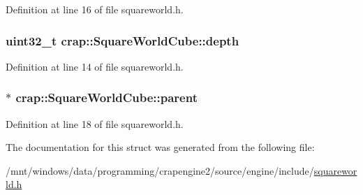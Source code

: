 Definition at line 16 of file squareworld.\+h.

\hypertarget{structcrap_1_1_square_world_cube_ace5f01b725ba2900714f1114e8d58ccf}{
\subsubsection[{depth}]{\setlength{\rightskip}{0pt plus 5cm}uint32\+\_\+t crap\+::\+Square\+World\+Cube\+::depth}}\label{structcrap_1_1_square_world_cube_ace5f01b725ba2900714f1114e8d58ccf}


Definition at line 14 of file squareworld.\+h.

\hypertarget{structcrap_1_1_square_world_cube_adf6b00d13203e191b4056f3e64f51582}{
\subsubsection[{parent}]{$\ast$ crap\+::\+Square\+World\+Cube\+::parent}}\label{structcrap_1_1_square_world_cube_adf6b00d13203e191b4056f3e64f51582}


Definition at line 18 of file squareworld.\+h.



The documentation for this struct was generated from the following file\+:\begin{DoxyCompactItemize}
\item 
/mnt/windows/data/programming/crapengine2/source/engine/include/\hyperlink{squareworld_8h}{squareworld.\+h}\end{DoxyCompactItemize}
